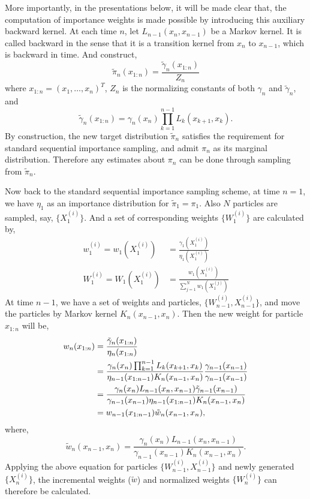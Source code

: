 More importantly, in the presentations below, it will be made clear that, the
computation of importance weights is made possible by introducing this
auxiliary backward kernel. At each time $n$, let $L_{n-1}(x_n,x_{n-1})$ be a
Markov kernel. It is called backward in the sense that it is a transition
kernel from $x_n$ to $x_{n-1}$, which is backward in time. And construct,
\begin{equation}
  \tilde{\pi}_n(x_{1:n}) = \frac{\tilde{\gamma}_n(x_{1:n})}{Z_n}
\end{equation}
where $x_{1:n} = (x_1,\dots,x_n)^T$, $Z_n$ is the normalizing constants of
both $\gamma_n$ and $\tilde{\gamma}_n$, and
\begin{equation}
  \tilde{\gamma}_n(x_{1:n}) = \gamma_n(x_n)
  \prod_{k=1}^{n-1}L_k(x_{k+1},x_k).
\end{equation}
By construction, the new target distribution $\tilde{\pi}_n$ satisfies the
requirement for standard sequential importance sampling, and admit $\pi_n$
as its marginal distribution. Therefore any estimates about $\pi_n$ can be
done through sampling from $\tilde{\pi}_n$.

Now back to the standard sequential importance sampling scheme, at time
$n=1$, we have $\eta_1$ as an importance distribution for $\tilde{\pi}_1 =
\pi_1$. Also $N$ particles are sampled, say, $\{X_1^{(i)}\}$. And a set of
corresponding weights $\{W_1^{(i)}\}$ are calculated by,
\begin{align}
  w_1^{(i)} =
  w_1(X_1^{(i)}) &= \frac{\gamma_1(X_1^{(i)})}{\eta_1(X_1^{(i)})}
  \label{eq:ini_weight}\\
  W_1^{(i)} =
  W_1(X_1^{(i)}) &= \frac{w_1(X_1^{(i)})}{\sum_{j=1}^Nw_1(X_1^{(j)})}
  \label{eq:ini_weight_norm}
\end{align}
At time $n-1$, we have a set of weights and particles, $\{W_{n-1}^{(i)},
  X_{n-1}^{(i)}\}$, and move the particles by Markov kernel $K_n(x_{n-1},
x_n)$. Then the new weight for particle $x_{1:n}$ will be,
\begin{align}
  w_n(x_{1:n}) &= \frac{\tilde{\gamma}_n(x_{1:n})}{\eta_n(x_{1:n})}
  \allowdisplaybreaks\notag\\
  &= \frac{\gamma_n(x_n)\prod_{k=1}^{n-1}L_k(x_{k+1},x_k)}
  {\eta_{n-1}(x_{1:n-1})K_n(x_{n-1},x_n)}
  \frac{\gamma_{n-1}(x_{n-1})}{\gamma_{n-1}(x_{n-1})} \notag\\
  &= \frac{\gamma_n(x_n)L_{n-1}(x_n,x_{n-1})\tilde{\gamma}_{n-1}(x_{n-1})}
  {\gamma_{n-1}(x_{n-1})\eta_{n-1}(x_{1:n-1})K_n(x_{n-1},x_n)} \notag\\
  &= w_{n-1}(x_{1:n-1})\tilde{w}_n(x_{n-1},x_n),
\end{align}
where,
\begin{equation}
  \tilde{w}_n(x_{n-1},x_n) =
  \frac{\gamma_n(x_n)L_{n-1}(x_n,x_{n-1})}
  {\gamma_{n-1}(x_{n-1})K_n(x_{n-1},x_n)}.
  \label{eq:incr_weight}
\end{equation}
Applying the above equation for particles $\{W_{n-1}^{(i)}, X_{n-1}^{(i)}\}$
and newly generated $\{X_n^{(i)}\}$, the incremental weights ($\tilde{w}$)
and normalized weights $\{W_n^{(i)}\}$ can therefore be calculated.

